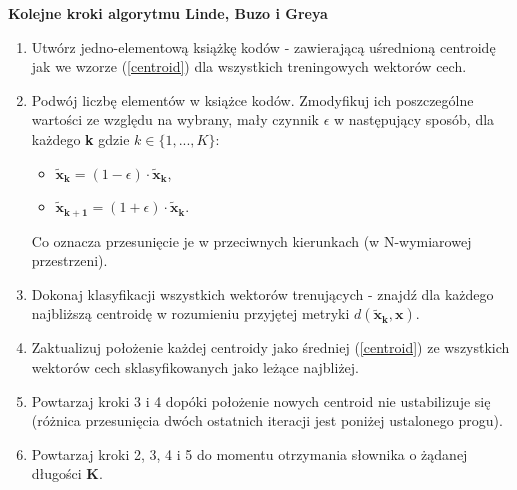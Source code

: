 \textbf{Kolejne kroki algorytmu Linde, Buzo i Greya\cite{minidsp}}
\begin{enumerate}
    \item Utwórz jedno-elementową książkę kodów - zawierającą uśrednioną centroidę jak we wzorze (\ref{centroid}) dla wszystkich treningowych wektorów cech.
  \item Podwój liczbę elementów w książce kodów. Zmodyfikuj ich poszczególne wartości ze względu na wybrany, mały czynnik $\epsilon$ w następujący sposób, dla każdego \textbf{k} gdzie \textbf{$ k \in \{1,...,K\}$}:
    \begin{itemize}
      \item $ \bm{\tilde{x}_k} = (1 - \epsilon) \cdot \bm{\tilde{x}_k} $,
      \item $ \bm{\tilde{x}_{k+1}} = (1 + \epsilon) \cdot \bm{\tilde{x}_k} $.
    \end{itemize}
    Co oznacza przesunięcie je w przeciwnych kierunkach (w N-wymiarowej przestrzeni).
  \item Dokonaj klasyfikacji wszystkich wektorów trenujących - znajdź dla każdego najbliższą centroidę w rozumieniu przyjętej metryki $ d(\bm{\tilde{x}_k}, \bm{x})$. 
  \item Zaktualizuj położenie każdej centroidy jako średniej (\ref{centroid}) ze wszystkich wektorów cech sklasyfikowanych jako leżące najbliżej.
  \item Powtarzaj kroki 3 i 4 dopóki położenie nowych centroid nie ustabilizuje się (różnica przesunięcia dwóch ostatnich iteracji jest poniżej ustalonego progu).
  \item Powtarzaj kroki 2, 3, 4 i 5 do momentu otrzymania słownika o żądanej długości \textbf{K}.
\end{enumerate}



